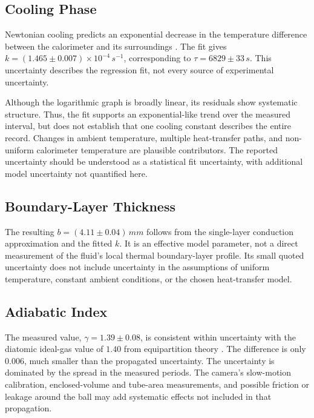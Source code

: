 \documentclass[12pt,a4paper]{article}
\begin{document}
\subsection{Cooling Phase}

Newtonian cooling predicts an exponential decrease in the
temperature difference between the calorimeter and its
surroundings \cite{py2107,incropera2018}. The fit gives
$k=(1.465\pm0.007)\times10^{-4}\,\si{s^{-1}}$, corresponding to
$\tau=6829\pm33\,\si{s}$. This uncertainty describes the
regression fit, not every source of experimental uncertainty.

Although the logarithmic graph is broadly linear, its residuals
show systematic structure. Thus, the fit supports an
exponential-like trend over the measured interval, but does not
establish that one cooling constant describes the entire record.
Changes in ambient temperature, multiple heat-transfer paths,
and non-uniform calorimeter temperature are plausible
contributors. The reported uncertainty should be understood as
a statistical fit uncertainty, with additional model uncertainty
not quantified here.

\subsection{Boundary-Layer Thickness}

The resulting $b=(4.11\pm0.04)\,\si{mm}$ follows from the
single-layer conduction approximation and the fitted $k$. It is
an effective model parameter, not a direct measurement of the
fluid's local thermal boundary-layer profile. Its small quoted
uncertainty does not include uncertainty in the assumptions of
uniform temperature, constant ambient conditions, or the chosen
heat-transfer model.

\subsection{Adiabatic Index}

The measured value, $\gamma=1.39\pm0.08$, is consistent within
uncertainty with the diatomic ideal-gas value of $1.40$ from
equipartition theory \cite{py2107}. The difference is only
$0.006$, much smaller than the propagated uncertainty. The
uncertainty is dominated by the spread in the measured periods.
The camera's slow-motion calibration, enclosed-volume and
tube-area measurements, and possible friction or leakage around
the ball may add systematic effects not included in that
propagation.
\end{document}
